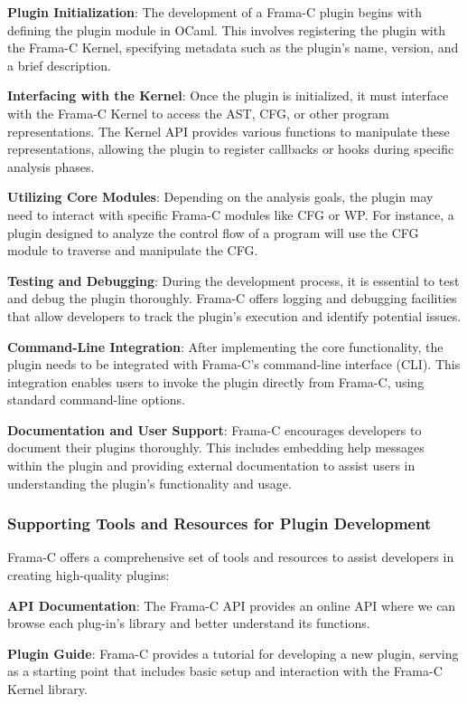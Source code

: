 \documentclass[10pt]{article}
\begin{document}
\begin{singlespace}
\textbf{Plugin Initialization}: The development of a Frama-C plugin begins with defining the plugin module in OCaml. This involves registering the plugin with the Frama-C Kernel, specifying metadata such as the plugin’s name, version, and a brief description.

\textbf{Interfacing with the Kernel}: Once the plugin is initialized, it must interface with the Frama-C Kernel to access the AST, CFG, or other program representations. The Kernel API provides various functions to manipulate these representations, allowing the plugin to register callbacks or hooks during specific analysis phases.

\textbf{Utilizing Core Modules}: Depending on the analysis goals, the plugin may need to interact with specific Frama-C modules like CFG or WP. For instance, a plugin designed to analyze the control flow of a program will use the CFG module to traverse and manipulate the CFG.

\textbf{Testing and Debugging}: During the development process, it is essential to test and debug the plugin thoroughly. Frama-C offers logging and debugging facilities that allow developers to track the plugin's execution and identify potential issues.

\textbf{Command-Line Integration}: After implementing the core functionality, the plugin needs to be integrated with Frama-C’s command-line interface (CLI). This integration enables users to invoke the plugin directly from Frama-C, using standard command-line options.

\textbf{Documentation and User Support}: Frama-C encourages developers to document their plugins thoroughly. This includes embedding help messages within the plugin and providing external documentation to assist users in understanding the plugin’s functionality and usage.

\subsubsection{Supporting Tools and Resources for Plugin Development}
Frama-C offers a comprehensive set of tools and resources to assist developers in creating high-quality plugins:

\textbf{API Documentation}: The Frama-C API provides an online API where we can browse each plug-in's library and better understand its functions.

\textbf{Plugin Guide}: Frama-C provides a tutorial for developing a new plugin, serving as a starting point that includes basic setup and interaction with the Frama-C Kernel library.


\end{singlespace}
\end{document}
